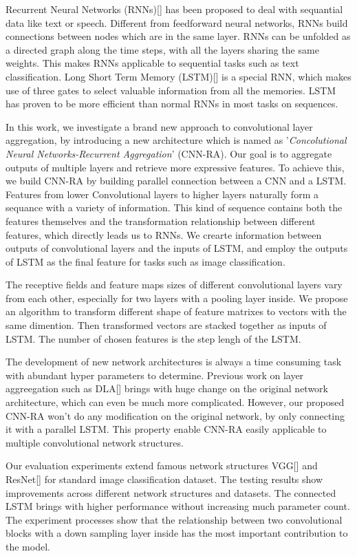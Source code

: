 \documentclass[runningheads]{llncs}
\begin{document}
Recurrent Neural Networks (RNNs)[] has been proposed to deal with sequantial data like text or speech. Different from feedforward neural networks, RNNs build connections between nodes which are in the same layer. RNNs can be unfolded as a directed graph along the time steps, with all the layers sharing the same weights. This makes RNNs applicable to sequential tasks such as text classification. Long Short Term Memory (LSTM)[] is a special RNN, which makes use of three gates to select valuable information from all the memories. LSTM has proven to be more efficient than normal RNNs in most tasks on sequences.

In this work, we investigate a brand new approach to convolutional layer aggregation, by introducing a new architecture which is named as '\emph{Concolutional Neural Networks-Recurrent Aggregation}' (CNN-RA).  Our goal is to aggregate outputs of multiple layers and retrieve more expressive features. To achieve this, we build CNN-RA by building parallel connection between a CNN and a LSTM. Features from lower Convolutional layers to higher layers naturally form a sequance with a variety of information. This kind of sequence contains both the features themselves and the transformation relationship between different features, which directly leads us to RNNs. We crearte information between outputs of convolutional layers and the inputs of LSTM, and employ the outputs of LSTM as the final feature for tasks such as image classification.

The receptive fields and feature maps sizes of different convolutional layers vary from each other, especially for two layers with a pooling layer inside. We propose an algorithm to transform different shape of feature matrixes to vectors with the same dimention. Then transformed vectors are stacked together as inputs of LSTM. The number of chosen features is the step lengh of the LSTM.

The development of new network architectures is always a time consuming task with abundant hyper parameters to determine. Previous work on layer aggreegation such as DLA[] brings with huge change on the original network architecture, which can even be much more complicated. However, our proposed CNN-RA won't do any modification on the original network, by only connecting it with a parallel LSTM. This property enable CNN-RA easily applicable to multiple convolutional network structures. 

Our evaluation experiments extend famous network structures VGG[] and ResNet[] for standard image classification dataset. The testing results show improvements across different network structures and datasets. The connected LSTM brings with higher performance without increasing much parameter count. The experiment processes show that the relationship between two convolutional blocks with a down sampling layer inside has the most important contribution to the model.
\end{document}
